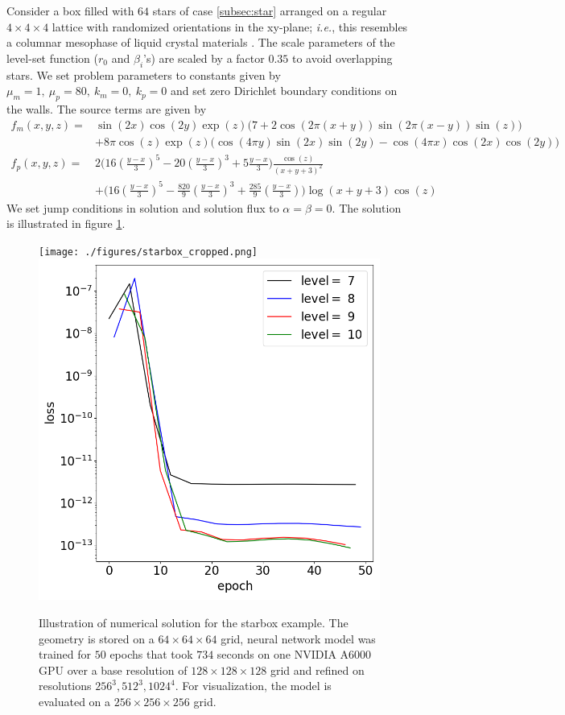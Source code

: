 \documentclass{elsarticle}
\begin{document}
Consider a box filled with $64$ stars of case \ref{subsec:star} arranged on a regular $4\times 4\times 4$ lattice with randomized orientations in the xy-plane; \textit{i.e.}, this resembles a columnar mesophase of liquid crystal materials \cite{oswald2005smectic,ANDRIENKO2018520}. The scale parameters of the level-set function ($r_0$ and $\beta_i$'s) are scaled by a factor $0.35$ to avoid overlapping stars. We set problem parameters to constants given by $\mu_m= 1,\ \mu_p=80,\ k_m=0,\ k_p=0 $ and set zero Dirichlet boundary conditions on the walls. The source terms are given by
\begin{align*}
f_m(x,y,z)=& \sin(2 x)\cos(2 y) \exp(z) \bigg(7  + 2 \cos(2 \pi (x+y)) \sin(2\pi(x-y))\sin(z)\bigg)  \\
&  +8\pi \cos(z) \exp(z) \bigg(\cos(4\pi y) \sin(2 x) \sin(2 y) -\cos(4\pi x) \cos(2 x)\cos(2 y) \bigg) \\
f_p(x,y,z)=&  2 \bigg( 16(\frac{y-x}{3})^5 - 20(\frac{y-x}{3})^3 + 5\frac{y-x}{3} \bigg) \frac{\cos(z)}{ (x+y+3)^2}  \\
& +\bigg( 16 (\frac{y-x}{3})^5 -\frac{820}{9} (\frac{y-x}{3})^3 + \frac{285}{9}(\frac{y-x}{3}) \bigg) \log(x+y+3)\cos(z)
\end{align*}
We set jump conditions in solution and solution flux to $\alpha=\beta=0$. The solution is illustrated in figure \ref{fig:starbox}.

\begin{figure}
	\centering
	\texttt{[image: ./figures/starbox\_cropped.png]}
	\includegraphics[width=0.45\linewidth]{./figures/poisson_solver_loss_starbox.png}
	\caption{Illustration of numerical solution for the starbox example. The geometry is stored on a $64\times 64\times 64$ grid, neural network model was trained for $50$ epochs that took $734$ seconds on one NVIDIA A6000 GPU over a base resolution of $128\times 128\times 128$ grid and refined on resolutions $256^3,512^3,1024^4$. For visualization, the model is evaluated on a $256\times 256 \times 256$ grid.}
	\label{fig:starbox}
\end{figure}
\end{document}

